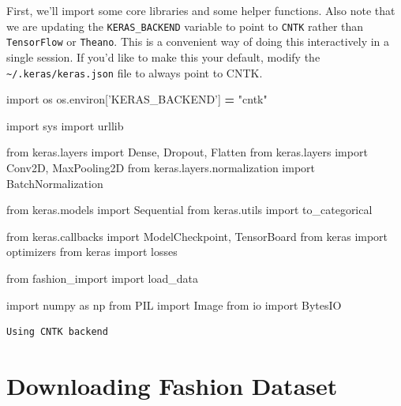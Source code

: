 \documentclass[]{book}
\newenvironment{Shaded}{\begin{snugshade}}{\end{snugshade}}
\newcommand{\StringTok}[1]{\textcolor[rgb]{0.31,0.60,0.02}{#1}}
\newcommand{\ImportTok}[1]{#1}
\newcommand{\OperatorTok}[1]{\textcolor[rgb]{0.81,0.36,0.00}{\textbf{#1}}}
\newcommand{\NormalTok}[1]{#1}
\theoremstyle{definition}
\theoremstyle{definition}
\theoremstyle{definition}
\theoremstyle{remark}
\begin{document}
First, we'll import some core libraries and some helper functions. Also
note that we are updating the \texttt{KERAS\_BACKEND} variable to point
to \texttt{CNTK} rather than \texttt{TensorFlow} or \texttt{Theano}.
This is a convenient way of doing this interactively in a single
session. If you'd like to make this your default, modify the
\texttt{\textasciitilde{}/.keras/keras.json} file to always point to
CNTK.

\begin{Shaded}
\begin{Highlighting}[]
\ImportTok{import}\NormalTok{ os}
\NormalTok{os.environ[}\StringTok{'KERAS_BACKEND'}\NormalTok{] }\OperatorTok{=} \StringTok{"cntk"}

\ImportTok{import}\NormalTok{ sys}
\ImportTok{import}\NormalTok{ urllib}

\ImportTok{from}\NormalTok{ keras.layers }\ImportTok{import}\NormalTok{ Dense, Dropout, Flatten}
\ImportTok{from}\NormalTok{ keras.layers }\ImportTok{import}\NormalTok{ Conv2D, MaxPooling2D}
\ImportTok{from}\NormalTok{ keras.layers.normalization }\ImportTok{import}\NormalTok{ BatchNormalization}

\ImportTok{from}\NormalTok{ keras.models }\ImportTok{import}\NormalTok{ Sequential}
\ImportTok{from}\NormalTok{ keras.utils }\ImportTok{import}\NormalTok{ to_categorical}

\ImportTok{from}\NormalTok{ keras.callbacks }\ImportTok{import}\NormalTok{ ModelCheckpoint, TensorBoard}
\ImportTok{from}\NormalTok{ keras }\ImportTok{import}\NormalTok{ optimizers}
\ImportTok{from}\NormalTok{ keras }\ImportTok{import}\NormalTok{ losses}

\ImportTok{from}\NormalTok{ fashion_import }\ImportTok{import}\NormalTok{ load_data}

\ImportTok{import}\NormalTok{ numpy }\ImportTok{as}\NormalTok{ np}
\ImportTok{from}\NormalTok{ PIL }\ImportTok{import}\NormalTok{ Image}
\ImportTok{from}\NormalTok{ io }\ImportTok{import}\NormalTok{ BytesIO}
\end{Highlighting}
\end{Shaded}

\begin{verbatim}
Using CNTK backend
\end{verbatim}

\section{Downloading Fashion Dataset}\label{downloading-fashion-dataset}
\end{document}

